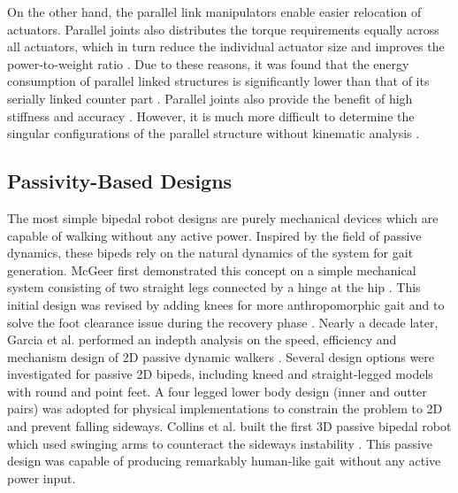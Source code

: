 On the other hand, the parallel link manipulators enable easier relocation of actuators. Parallel joints also distributes the torque requirements equally across all actuators, which in turn reduce the individual actuator size and improves the power-to-weight ratio \cite{Lohmeier2006,Konno2002}. Due to these reasons, it was found that the energy consumption of parallel linked structures is significantly lower than that of its serially linked counter part \cite{Morisawa2000}. Parallel joints also provide the benefit of high stiffness and accuracy \cite{Sellaouti2005}. However, it is much more difficult to determine the singular configurations of the parallel structure without kinematic analysis \cite{Sellaouti2005}.



\subsection{Passivity-Based Designs} %
\label{sub:related_passive_designs}
The most simple bipedal robot designs are purely mechanical devices which are capable of walking without any active power. Inspired by the field of passive dynamics, these bipeds rely on the natural dynamics of the system for gait generation. McGeer first demonstrated this concept on a simple mechanical system consisting of two straight legs connected by a hinge at the hip \cite{McGeer:1990uk}. This initial design was revised by adding knees for more anthropomorphic gait and to solve the foot clearance issue during the recovery phase \cite{McGeer:1990hh}. Nearly a decade later, Garcia et al. performed an indepth analysis on the speed, efficiency and mechanism design of 2D passive dynamic walkers \cite{Garcia:2000kv}. Several design options were investigated for passive 2D bipeds, including kneed and straight-legged models with round and point feet. A four legged lower body design (inner and outter pairs) was adopted for physical implementations to constrain the problem to 2D and prevent falling sideways. Collins et al. built the first 3D passive bipedal robot which used swinging arms to counteract the sideways instability \cite{Collins:2001jq}. This passive design was capable of producing remarkably human-like gait without any active power input. 

